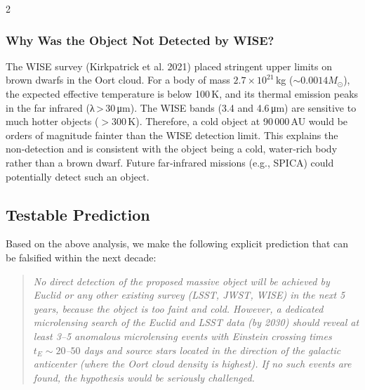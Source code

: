 \documentclass[11pt,a4paper]{article}
\begin{document}
\begin{multicols}{2}
		\subsubsection{Why Was the Object Not Detected by WISE?}
		
		The WISE survey (Kirkpatrick et al. 2021) placed stringent upper limits on brown dwarfs in the Oort cloud. For a body of mass \(2.7\times10^{21}\) kg (\(\sim 0.0014 M_{\odot}\)), the expected effective temperature is below 100 K, and its thermal emission peaks in the far infrared (λ > 30 μm). The WISE bands (3.4 and 4.6 μm) are sensitive to much hotter objects (\(>300\) K). Therefore, a cold object at 90 000 AU would be orders of magnitude fainter than the WISE detection limit. This explains the non‑detection and is consistent with the object being a cold, water‑rich body rather than a brown dwarf. Future far‑infrared missions (e.g., SPICA) could potentially detect such an object.
		
		\subsection{Testable Prediction}
		
		Based on the above analysis, we make the following explicit prediction that can be falsified within the next decade:
		
		\begin{quote}
			\itshape
			No direct detection of the proposed massive object will be achieved by Euclid or any other existing survey (LSST, JWST, WISE) in the next 5 years, because the object is too faint and cold. However, a dedicated microlensing search of the Euclid and LSST data (by 2030) should reveal at least 3–5 anomalous microlensing events with Einstein crossing times \(t_E \sim 20\)–\(50\) days and source stars located in the direction of the galactic anticenter (where the Oort cloud density is highest). If no such events are found, the hypothesis would be seriously challenged.
		\end{quote}
		
	\end{multicols}
	
\end{document}
